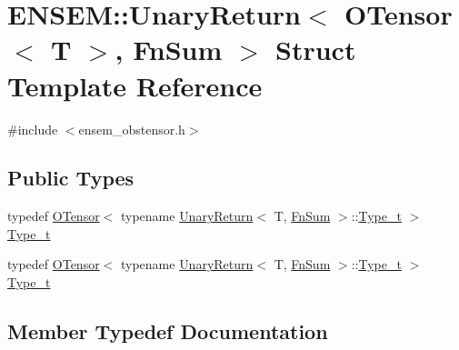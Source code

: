 \hypertarget{structENSEM_1_1UnaryReturn_3_01OTensor_3_01T_01_4_00_01FnSum_01_4}{}\section{E\+N\+S\+EM\+:\+:Unary\+Return$<$ O\+Tensor$<$ T $>$, Fn\+Sum $>$ Struct Template Reference}
\label{structENSEM_1_1UnaryReturn_3_01OTensor_3_01T_01_4_00_01FnSum_01_4}


{\ttfamily \#include $<$ensem\+\_\+obstensor.\+h$>$}

\subsection*{Public Types}
\begin{DoxyCompactItemize}
\item 
typedef \mbox{\hyperlink{classENSEM_1_1OTensor}{O\+Tensor}}$<$ typename \mbox{\hyperlink{structENSEM_1_1UnaryReturn}{Unary\+Return}}$<$ T, \mbox{\hyperlink{structENSEM_1_1FnSum}{Fn\+Sum}} $>$\+::\mbox{\hyperlink{structENSEM_1_1UnaryReturn_3_01OTensor_3_01T_01_4_00_01FnSum_01_4_a97a77020ae2f9a17419c0a6b9c45b5b9}{Type\+\_\+t}} $>$ \mbox{\hyperlink{structENSEM_1_1UnaryReturn_3_01OTensor_3_01T_01_4_00_01FnSum_01_4_a97a77020ae2f9a17419c0a6b9c45b5b9}{Type\+\_\+t}}
\item 
typedef \mbox{\hyperlink{classENSEM_1_1OTensor}{O\+Tensor}}$<$ typename \mbox{\hyperlink{structENSEM_1_1UnaryReturn}{Unary\+Return}}$<$ T, \mbox{\hyperlink{structENSEM_1_1FnSum}{Fn\+Sum}} $>$\+::\mbox{\hyperlink{structENSEM_1_1UnaryReturn_3_01OTensor_3_01T_01_4_00_01FnSum_01_4_a97a77020ae2f9a17419c0a6b9c45b5b9}{Type\+\_\+t}} $>$ \mbox{\hyperlink{structENSEM_1_1UnaryReturn_3_01OTensor_3_01T_01_4_00_01FnSum_01_4_a97a77020ae2f9a17419c0a6b9c45b5b9}{Type\+\_\+t}}
\end{DoxyCompactItemize}


\subsection{Member Typedef Documentation}
\mbox{\label{structENSEM_1_1UnaryReturn_3_01OTensor_3_01T_01_4_00_01FnSum_01_4_a97a77020ae2f9a17419c0a6b9c45b5b9}} 
